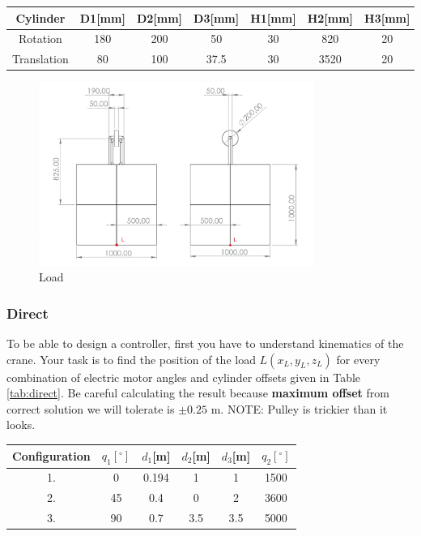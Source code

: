 \documentclass{article}
\begin{document}
	\begin{center}
		\label{tab:cylinder_tab}
		\begin{tabular}{||c|| c c c || c c c ||}
			\hline
			Cylinder & D1[mm] & D2[mm] &  D3[mm] & H1[mm] & H2[mm] & H3[mm] \\
			\hline\hline
			Rotation & 180 & 200 & 50 & 30 & 820 & 20\\ 
			\hline
			Translation & 80 & 100 & 37.5 & 30 & 3520 & 20 \\
			\hline
		\end{tabular}
	\end{center}
	
	\begin{figure}[h!]
		\centering
		\includegraphics[width=0.8\textwidth]{teret.jpg}
		\caption{Load}
		\label{fig:load}
	\end{figure}
	
	\subsubsection{Direct}
	
	To be able to design a controller, first you have to understand  kinematics of the crane. Your task is to find the position of the load $L(x_L,y_L,z_L)$ for every combination of electric motor angles and cylinder offsets given in Table \ref{tab:direct}. Be careful calculating the result because \textbf{maximum offset} from correct solution we will tolerate is $\pm 0.25$ m.
	\noindent NOTE: Pulley is trickier than it looks.
	
	
	\begin{center}
		\label{tab:direct}
		\begin{tabular}{|| c || c c c c c ||}
			\hline
			Configuration & $q_1[^{\circ}]$ & $d_1$[m] & $d_2$[m] & $d_3$[m] &  
			$q_2[^{\circ}]$\\
			\hline\hline
			1. & 0 & 0.194 & 1 & 1 & 1500 \\ 
			\hline
			2. & 45 & 0.4 & 0 & 2 & 3600 \\
			\hline
			3. & 90 & 0.7 & 3.5  & 3.5 & 5000 \\
			\hline
		\end{tabular}
	\end{center}
	
\end{document}
